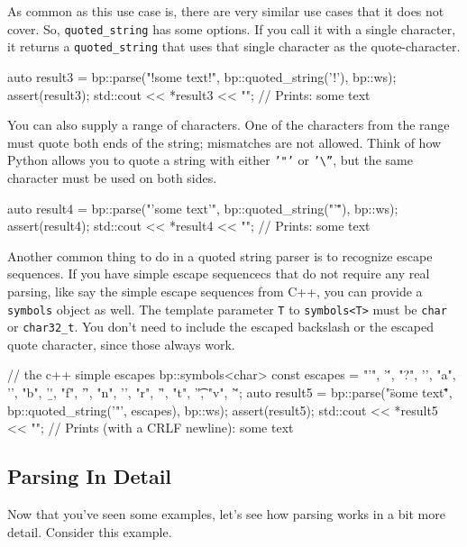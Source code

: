 As common as this use case is, there are very similar use cases that it does not cover. So, \texttt{quoted\_string} has some options. If you call it with a single character, it returns a \texttt{quoted\_string} that uses that single character as the quote-character.

\begin{code}
auto result3 = bp::parse("!some text!", bp::quoted_string('!'), bp::ws);
assert(result3);
std::cout << *result3 << "\n"; // Prints: some text
\end{code}

You can also supply a range of characters. One of the characters from the range must quote both ends of the string; mismatches are not allowed. Think of how Python allows you to quote a string with either \texttt{'"'} or \texttt{'\textbackslash{}''}, but the same character must be used on both sides.

\begin{code}
auto result4 = bp::parse("'some text'", bp::quoted_string("'\""), bp::ws);
assert(result4);
std::cout << *result4 << "\n"; // Prints: some text
\end{code}

Another common thing to do in a quoted string parser is to recognize escape sequences. If you have simple escape sequencecs that do not require any real parsing, like say the simple escape sequences from C++, you can provide a \texttt{symbols} object as well. The template parameter \texttt{T} to \texttt{symbols<T>} must be \texttt{char} or \texttt{char32\_t}. You don't need to include the escaped backslash or the escaped quote character, since those always work.

\begin{code}
// the c++ simple escapes
bp::symbols<char> const escapes = {
    {"'", '\''},
    {"?", '\?'},
    {"a", '\a'},
    {"b", '\b'},
    {"f", '\f'},
    {"n", '\n'},
    {"r", '\r'},
    {"t", '\t'},
    {"v", '\v'}};
auto result5 =
    bp::parse("\"some text\r\"", bp::quoted_string('"', escapes), bp::ws);
assert(result5);
std::cout << *result5 << "\n"; // Prints (with a CRLF newline): some text
\end{code}

\label{tutorial_split_002.html}{}

\subsection{Parsing In Detail}

Now that you've seen some examples, let's see how parsing works in a bit more detail. Consider this example.

